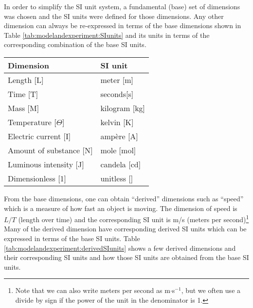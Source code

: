 In order to simplify the SI unit system, a fundamental (base) set of dimensions was chosen and the SI units were defined for those dimensions. Any other dimension can always be re-expressed in terms of the base dimensions shown in Table \ref{tab:modelandexperiment:SIunits} and its units in terms of the corresponding combination of the base SI units.

\begin{center}
\begin{tabular}{ll }
\textbf{Dimension}&\textbf{SI unit}\\
\hline
\hline
Length [L]& meter [m]\\ \hline
Time [T]& seconds[s] \\ \hline
Mass [M]& kilogram [kg]\\ \hline
Temperature [$\Theta$]& kelvin [K] \\ \hline
Electric current [I]& amp\`ere [A]\\ \hline
Amount of substance [N]& mole [mol] \\ \hline
Luminous intensity [J]& candela [cd] \\ \hline
Dimensionless [1]& unitless [] \\ \hline
\end{tabular}
\end{center}

From the base dimensions, one can obtain ``derived'' dimensions such as ``speed'' which is a measure of how fast an object is moving. The dimension of speed is $L/T$ (length over time) and the corresponding SI unit is m/s (meters per second)\footnote{Note that we can also write meters per second as m$\cdot$s$^{-1}$, but we often use a divide by sign if the power of the unit in the denominator is 1.} Many of the derived dimension have corresponding derived SI units which can be expressed in terms of the base SI units. Table \ref{tab:modelandexperiment:derivedSIunits} shows a few derived dimensions and their corresponding SI units and how those SI units are obtained from the base SI units.

